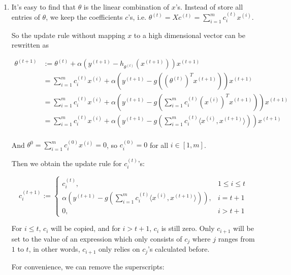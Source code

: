 \begin{answer}\\
	\begin{enumerate}
		\item
		
		It's easy to find that $\theta$ is the linear combination of $x$'s. Instead of store all entries of $\theta$, we keep the coefficients $c$'s, i.e. $\theta^{(t)} = Xc^{(t)} = \sum_{i = 1}^m c^{(t)}_i x^{(i)}$.
		
		So the update rule without mapping $x$ to a high dimensional vector can be rewritten as
		
		$$
		\begin{aligned}
			\theta^{(t+1)} & := \theta^{(t)} + \alpha (y^{(t + 1)} - h_{\theta^{(t)}}(x^{(t + 1)})) x^{(t + 1)}\\
			& = \sum_{i = 1}^m c^{(t)}_i x^{(i)} + \alpha \left(y^{(t + 1)} - g\left((\theta^{(t)})^T x^{(t + 1)}\right)\right) x^{(t + 1)}\\
			& = \sum_{i = 1}^m c^{(t)}_i x^{(i)} + \alpha \left(y^{(t + 1)} - g\left(\sum_{i = 1}^m c^{(t)}_i (x^{(i)})^T x^{(t + 1)}\right)\right) x^{(t + 1)}\\
			& = \sum_{i = 1}^m c^{(t)}_i x^{(i)} + \alpha \left(y^{(t + 1)} - g\left(\sum_{i = 1}^m c^{(t)}_i \langle x^{(i)}, x^{(t + 1)}\rangle\right)\right) x^{(t + 1)}\\
		\end{aligned}
		$$
		
		And $\theta^{0} = \sum_{i = 1}^m c^{(0)}_i x^{(i)} = 0$, so $c^{(0)}_i = 0$ for all $i \in [1, m]$.
		
		Then we obtain the update rule for $c^{(t)}_i$'s:
		
		$$
		c^{(t + 1)}_i := \begin{cases}
			c^{(t)}_i, & 1\le i\le t\\
			\alpha\left(y^{(t + 1)} - g\left(\sum_{i = 1}^m c^{(t)}_i \langle x^{(i)}, x^{(t + 1)}\rangle\right)\right), & i = t + 1\\
			0, & i > t + 1
		\end{cases}
		$$
		
		For $i\le t$, $c_i$ will be copied, and for $i > t + 1$, $c_i$ is still zero. Only $c_{i + 1}$ will be set to the value of an expression which only consists of $c_j$ where $j$ ranges from $1$ to $t$, in other words, $c_{i + 1}$ only relies on $c_j$'s calculated before.
		
		For convenience, we can remove the superscripts:
		

\end{enumerate}
\end{answer}
